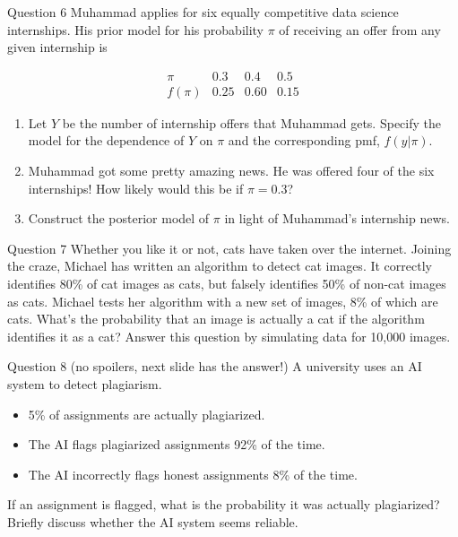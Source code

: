 \documentclass[12pt]{beamer}
\begin{document}
{
\begin{frame}{}
\begin{block}{Question 6}
Muhammad applies for six equally competitive data science internships. 
His prior model for his probability $\pi$ of receiving an offer from any 
given internship is

\[
\begin{array}{c|ccc}
\pi & 0.3 & 0.4 & 0.5 \\ \hline
f(\pi) & 0.25 & 0.60 & 0.15
\end{array}
\]

\begin{enumerate}
\item[a)] Let $Y$ be the number of internship offers that Muhammad gets.
  Specify the model for the dependence of $Y$ on $\pi$ and the corresponding pmf, $f(y|\pi)$.
\item[a)] Muhammad got some pretty amazing news.
  He was offered four of the six internships!
  How likely would this be if $\pi = 0.3$?
\item[c)] Construct the posterior model of $\pi$ in light of Muhammad’s internship news.
\end{enumerate}
\end{block}
\end{frame}

\begin{frame}{}
\begin{block}{Question 7}
Whether you like it or not, cats have taken over the internet.
Joining the craze, Michael has written an algorithm to detect cat images.
It correctly identifies 80\% of cat images as cats, but falsely identifies 50\% of non-cat images as cats.
Michael tests her algorithm with a new set of images, 8\% of which are cats. What’s the probability that an image is actually a cat if the algorithm identifies it as a cat?
Answer this question by simulating data for 10,000 images.
\end{block}
\end{frame}

\begin{frame}{}
\begin{block}{Question 8 \small \alert{(no spoilers, next slide has the answer!)}}
A university uses an AI system to detect plagiarism.
\begin{itemize}
\item 5\% of assignments are actually plagiarized.
\item The AI flags plagiarized assignments 92\% of the time.
\item The AI incorrectly flags honest assignments 8\% of the time.
\end{itemize}
If an assignment is flagged, what is the probability it was actually plagiarized?
Briefly discuss whether the AI system seems reliable.
\end{block}
\end{frame}

}
\end{document}
